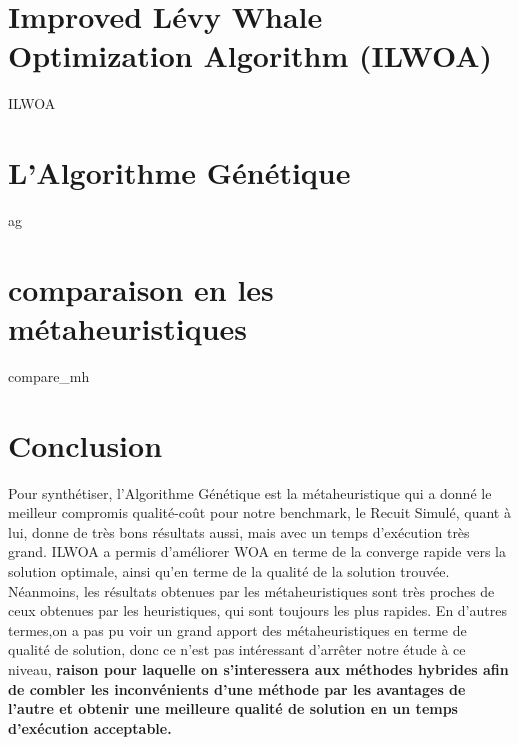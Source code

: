 \documentclass[12pt,a4paper, titlepage]{report}
\begin{document}
    \chapter{Improved Lévy Whale Optimization Algorithm (ILWOA)}
    {ILWOA}
    \chapter{L'Algorithme Génétique}
    {ag}
    \chapter{comparaison en les métaheuristiques}
    {compare_mh}
    \chapter{Conclusion}
    Pour synthétiser, l’Algorithme Génétique est la métaheuristique qui a donné le meilleur compromis qualité-coût pour notre benchmark, le Recuit Simulé, quant à lui, donne de très bons résultats aussi, mais avec un temps d'exécution très grand. ILWOA a permis d’améliorer WOA en terme de la converge rapide vers la solution optimale, ainsi qu’en terme de la qualité de la solution trouvée. Néanmoins, les résultats obtenues par les métaheuristiques sont très proches de ceux obtenues par les heuristiques, qui sont toujours les plus rapides. En d’autres termes,on a pas pu voir un grand apport des métaheuristiques en terme de qualité de solution, donc ce n’est pas intéressant d’arrêter notre étude à ce niveau, \textbf{raison pour laquelle on s’interessera aux méthodes hybrides afin de combler les inconvénients d’une méthode par les avantages de l’autre et obtenir une meilleure qualité de solution en un temps d'exécution acceptable.}
    
\end{document}
